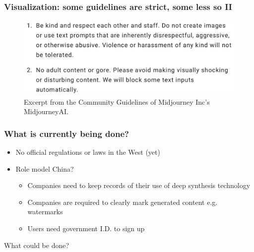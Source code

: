 \documentclass[
	11pt, compress%
]{beamer}
\begin{document}
\begin{frame}
\frametitle{Visualization: some guidelines are strict, some less so II}
\begin{figure}
\includegraphics[width=0.6\linewidth]{Images/CommunityGuidelinesMidjourneyAI.png}
\caption{\tiny Excerpt from the Community Guidelines of Midjourney Inc's MidjourneyAI\cite{MidJourneyTOS}.}
\end{figure}
\end{frame}

\begin{frame}
	\frametitle{What is currently being done?}

	\begin{itemize}
		\setlength\itemsep{1,3em}

	\item No official regulations or laws in the West (yet)
	\item Role model China?\cite{CACGuidelines}
	\begin{itemize}
		\setlength\itemsep{0,5em}
		\item Companies need to keep records of their use of deep synthesis technology
		\item Companies are required to clearly mark generated content e.g. watermarks
		\item Users need government I.D. to sign up
	\end{itemize}
\end{itemize}
\end{frame}



\begin{frame}
\begin{center}
	\huge What could be done?
\end{center}
\end{frame}
\end{document}
